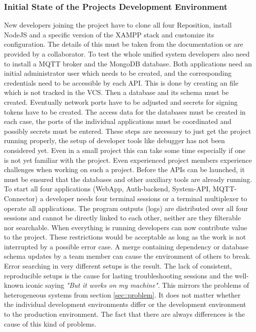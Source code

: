         \subsubsection{Initial State of the Projects Development Environment}
        New developers joining the project have to clone all four Reposition, install NodeJS and a specific version of the \ac{XAMPP} stack and customize its configuration. The details of this must be taken from the documentation or are provided by a collaborator. To test the whole unified system developers also need to install a MQTT broker and the MongoDB database. Both applications need an initial administrator user which needs to be created, and the corresponding credentials need to be accessible by each \ac{API}. This is done by creating an  file which is not tracked in the \ac{VCS}. Then a database and its schema must be created. Eventually network ports have to be adjusted and secrets for signing tokens have to be created.
        The access data for the databases must be created in each case, the ports of the individual applications must be coordinated and possibly secrets must be entered. These steps are necessary to just get the project running properly, the setup of developer tools like debugger has not been considered yet. Even in a small project this can take some time especially if one is not yet familiar with the project.\newline
        Even experienced project members experience challenges when working on such a project. Before the APIs can be launched, it must be ensured that the databases and other auxiliary tools are already running. To start all four applications (WebApp, Auth-backend, System-API, MQTT-Connector) a developer needs four terminal sessions or a terminal multiplexer to operate all applications. The program outputs (logs) are distributed over all four sessions and cannot be directly linked to each other, neither are they filterable nor searchable. When everything is running developers can now contribute value to the project. These restrictions would be acceptable as long as the work is not interrupted by a possible error case. A merge containing dependency or database schema updates by a team member can cause the environment of others to break. Error searching in very different setups is the result. The lack of consistent, reproducible setups is the cause for lasting troubleshooting sessions and the well-known iconic saying \textit{"But it works on my machine"}. This mirrors the problems of heterogeneous systems from section \ref{sec::problem}. It does not matter whether the individual development environments differ or the development environment to the production environment. The fact that there are always differences is the cause of this kind of problems. \newline
